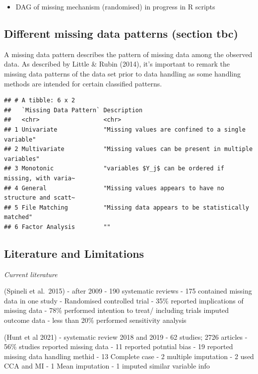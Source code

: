 \documentclass{article}
\providecommand{\tightlist}{%
  \setlength{\itemsep}{0pt}\setlength{\parskip}{0pt}}
\begin{document}
\begin{itemize}
\tightlist
\item
  DAG of missing mechanism (randomised) in progress in R scripts
\end{itemize}

\subsection{Different missing data patterns (section
tbc)}\label{different-missing-data-patterns-section-tbc}

A missing data pattern describes the pattern of missing data among the
observed data. As described by Little \& Rubin (2014), it's important to
remark the missing data patterns of the data set prior to data handling
as some handling methods are intended for certain classified patterns.

\begin{verbatim}
## # A tibble: 6 x 2
##   `Missing Data Pattern` Description                                            
##   <chr>                  <chr>                                                  
## 1 Univariate             "Missing values are confined to a single variable"     
## 2 Multivariate           "Missing values can be present in multiple variables"  
## 3 Monotonic              "variables $Y_j$ can be ordered if missing, with varia~
## 4 General                "Missing values appears to have no structure and scatt~
## 5 File Matching          "Missing data appears to be statistically matched"     
## 6 Factor Analysis        ""
\end{verbatim}

\subsection{Literature and
Limitations}\label{literature-and-limitations}

\emph{Current literature}

(Spineli et al.~2015) - after 2009 - 190 systematic reviews - 175
contained missing data in one study - Randomised controlled trial - 35\%
reported implications of missing data - 78\% performed intention to
treat/ including trials imputed outcome data - less than 20\% performed
sensitivity analysis

(Hunt et al 2021) - systematic review 2018 and 2019 - 62 studies; 2726
articles - 56\% studies reported missing data - 11 reported potntial
bias - 19 reported missing data handling methid - 13 Complete case - 2
multiple imputation - 2 used CCA and MI - 1 Mean imputation - 1 imputed
similar variable info
\end{document}
